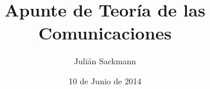 \documentclass[]{article}
\title{Apunte de Teoría de las Comunicaciones}
\author{ Julián Sackmann }
\date{10 de Junio de 2014}
\begin{document}
\ifpdf
{}
\else
{}
\fi

\setcounter{tocdepth}{4}

\newcommand{\ig}[2]{
\begin{center}
	\texttt{[image: images/\#2]}
\end{center}}
\newcommand{\subsubsubsection}[1]{\paragraph{#1}~\newline
 \indent }
\newcommand{\subsubsubsubsection}[1]{\subparagraph{#1}~\newline}
\newcommand{\partir}[4]{
\begin{minipage}[b]{#1\linewidth}\centering\begin{center}#3\end{center}\end{minipage}\begin{minipage}[b]{#2\linewidth}\centering\begin{center}#4\end{center}\end{minipage}
}
\newcommand{\flecha}[1]{\xrightarrow{\hspace*{0.3cm} #1 \hspace*{0.3cm}}}
\newcommand{\Flecha}[1]{\xRightarrow{\hspace*{0.3cm} #1 \hspace*{0.3cm}}}
\newcommand{\caja}[2]{\begin{center}
	\fbox{
		\parbox{#1\linewidth}{
			#2
		}
	}
\end{center}}
\renewcommand\contentsname{Índice}
\end{document}
